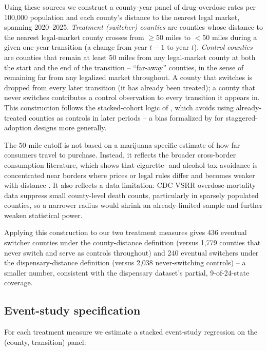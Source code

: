 \documentclass{article}
\begin{document}
Using these sources we construct a county-year panel of drug-overdose rates per 100{,}000 population and each
county's distance to the nearest legal market, spanning 2020--2025.
\emph{Treatment (switcher) counties} are counties whose distance to the nearest legal-market county crosses from
$\geq 50$ miles to $<50$ miles during a given one-year transition (a change from year $t-1$ to year $t$).
\emph{Control counties} are counties that remain at least 50 miles from any legal-market county at both the start
and the end of the transition -- ``far-away'' counties, in the sense of remaining far from any legalized market
throughout. A county that switches is dropped from every later transition (it has already been treated); a county
that never switches contributes a control observation to every transition it appears in. This construction follows
the stacked-cohort logic of \citet{Cengiz2019}, which avoids using already-treated counties as controls in later
periods -- a bias formalized by \citet{GoodmanBacon2021} for staggered-adoption designs more generally.

The 50-mile cutoff is not based on a marijuana-specific estimate of how far consumers travel to purchase. Instead,
it reflects the broader cross-border consumption literature, which shows that cigarette- and alcohol-tax avoidance
is concentrated near borders where prices or legal rules differ and becomes weaker with distance
\citep{Lovenheim2008,Beatty2009}. It also reflects a data limitation: CDC VSRR overdose-mortality data suppress
small county-level death counts, particularly in sparsely populated counties, so a narrower radius would shrink an
already-limited sample and further weaken statistical power.

Applying this construction to our two treatment measures gives 436 eventual switcher counties under the
county-distance definition (versus 1{,}779 counties that never switch and serve as controls throughout) and 240
eventual switchers under the dispensary-distance definition (versus 2{,}038 never-switching controls) -- a smaller
number, consistent with the dispensary dataset's partial, 9-of-24-state coverage.

\subsection{Event-study specification}

For each treatment measure we estimate a stacked event-study regression on the (county, transition) panel:
\end{document}
